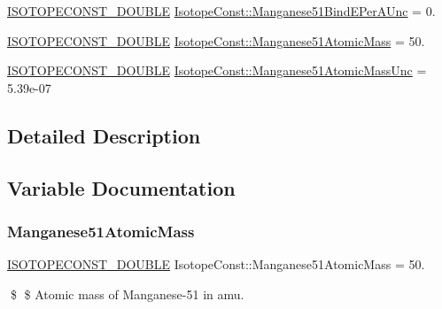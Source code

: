 \begin{DoxyCompactItemize}
\mbox{\hyperlink{group___isotope_const-_macros_ga8f45a7272ce02c0b4c65c44636ed719a}{I\+S\+O\+T\+O\+P\+E\+C\+O\+N\+S\+T\+\_\+\+D\+O\+U\+B\+LE}} \mbox{\hyperlink{group___isotope_const-_manganese-_mn51_gacd47a0dac2a8b1d0c168d107d6fba62c}{Isotope\+Const\+::\+Manganese51\+Bind\+E\+Per\+A\+Unc}} = 0.
\item 
\mbox{\hyperlink{group___isotope_const-_macros_ga8f45a7272ce02c0b4c65c44636ed719a}{I\+S\+O\+T\+O\+P\+E\+C\+O\+N\+S\+T\+\_\+\+D\+O\+U\+B\+LE}} \mbox{\hyperlink{group___isotope_const-_manganese-_mn51_ga68f858ee5660ccd547fb52f82280a2f6}{Isotope\+Const\+::\+Manganese51\+Atomic\+Mass}} = 50.
\item 
\mbox{\hyperlink{group___isotope_const-_macros_ga8f45a7272ce02c0b4c65c44636ed719a}{I\+S\+O\+T\+O\+P\+E\+C\+O\+N\+S\+T\+\_\+\+D\+O\+U\+B\+LE}} \mbox{\hyperlink{group___isotope_const-_manganese-_mn51_ga18f757840e453bfb09fc286d59225cf2}{Isotope\+Const\+::\+Manganese51\+Atomic\+Mass\+Unc}} = 5.\+39e-\/07
\end{DoxyCompactItemize}


\subsection{Detailed Description}


\subsection{Variable Documentation}
\mbox{\label{group___isotope_const-_manganese-_mn51_ga68f858ee5660ccd547fb52f82280a2f6}} 
\subsubsection{\texorpdfstring{Manganese51\+Atomic\+Mass}{Manganese51AtomicMass}}
{\footnotesize\ttfamily \mbox{\hyperlink{group___isotope_const-_macros_ga8f45a7272ce02c0b4c65c44636ed719a}{I\+S\+O\+T\+O\+P\+E\+C\+O\+N\+S\+T\+\_\+\+D\+O\+U\+B\+LE}} Isotope\+Const\+::\+Manganese51\+Atomic\+Mass = 50.}

\$ \$ Atomic mass of Manganese-\/51 in amu. \mbox{\label{group___isotope_const-_manganese-_mn51_ga18f757840e453bfb09fc286d59225cf2}} 
